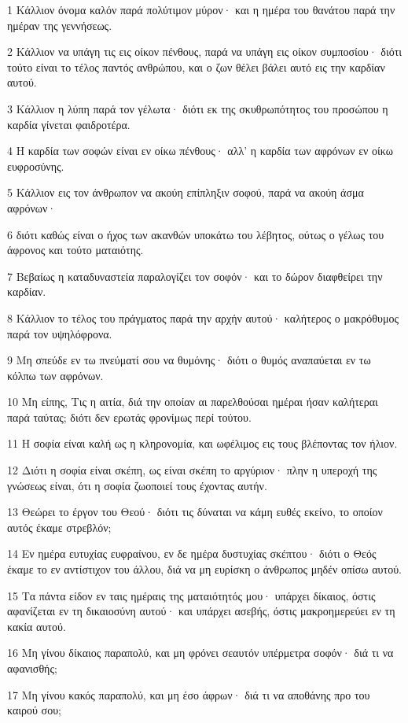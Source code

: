 \par 1 Κάλλιον όνομα καλόν παρά πολύτιμον μύρον· και η ημέρα του θανάτου παρά την ημέραν της γεννήσεως.
\par 2 Κάλλιον να υπάγη τις εις οίκον πένθους, παρά να υπάγη εις οίκον συμποσίου· διότι τούτο είναι το τέλος παντός ανθρώπου, και ο ζων θέλει βάλει αυτό εις την καρδίαν αυτού.
\par 3 Κάλλιον η λύπη παρά τον γέλωτα· διότι εκ της σκυθρωπότητος του προσώπου η καρδία γίνεται φαιδροτέρα.
\par 4 Η καρδία των σοφών είναι εν οίκω πένθους· αλλ' η καρδία των αφρόνων εν οίκω ευφροσύνης.
\par 5 Κάλλιον εις τον άνθρωπον να ακούη επίπληξιν σοφού, παρά να ακούη άσμα αφρόνων·
\par 6 διότι καθώς είναι ο ήχος των ακανθών υποκάτω του λέβητος, ούτως ο γέλως του άφρονος και τούτο ματαιότης.
\par 7 Βεβαίως η καταδυναστεία παραλογίζει τον σοφόν· και το δώρον διαφθείρει την καρδίαν.
\par 8 Κάλλιον το τέλος του πράγματος παρά την αρχήν αυτού· καλήτερος ο μακρόθυμος παρά τον υψηλόφρονα.
\par 9 Μη σπεύδε εν τω πνεύματί σου να θυμόνης· διότι ο θυμός αναπαύεται εν τω κόλπω των αφρόνων.
\par 10 Μη είπης, Τις η αιτία, διά την οποίαν αι παρελθούσαι ημέραι ήσαν καλήτεραι παρά ταύτας; διότι δεν ερωτάς φρονίμως περί τούτου.
\par 11 Η σοφία είναι καλή ως η κληρονομία, και ωφέλιμος εις τους βλέποντας τον ήλιον.
\par 12 Διότι η σοφία είναι σκέπη, ως είναι σκέπη το αργύριον· πλην η υπεροχή της γνώσεως είναι, ότι η σοφία ζωοποιεί τους έχοντας αυτήν.
\par 13 Θεώρει το έργον του Θεού· διότι τις δύναται να κάμη ευθές εκείνο, το οποίον αυτός έκαμε στρεβλόν;
\par 14 Εν ημέρα ευτυχίας ευφραίνου, εν δε ημέρα δυστυχίας σκέπτου· διότι ο Θεός έκαμε το εν αντίστιχον του άλλου, διά να μη ευρίσκη ο άνθρωπος μηδέν οπίσω αυτού.
\par 15 Τα πάντα είδον εν ταις ημέραις της ματαιότητός μου· υπάρχει δίκαιος, όστις αφανίζεται εν τη δικαιοσύνη αυτού· και υπάρχει ασεβής, όστις μακροημερεύει εν τη κακία αυτού.
\par 16 Μη γίνου δίκαιος παραπολύ, και μη φρόνει σεαυτόν υπέρμετρα σοφόν· διά τι να αφανισθής;
\par 17 Μη γίνου κακός παραπολύ, και μη έσο άφρων· διά τι να αποθάνης προ του καιρού σου;
